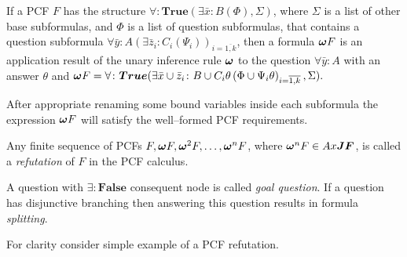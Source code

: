 \documentclass[runningheads,a4paper]{llncs}
\begin{document}

\begin{definition}
If a PCF $F$ has the structure $\forall\colon\boldsymbol{True}\left(\exists \bar{x}\colon B\left(\Phi\right),\Sigma\right)$, where $\Sigma$ is a list of other base subformulas, and $\Phi$ is a list of question subformulas, that contains a question subformula $\forall \bar{y}\colon A(\exists \bar{z}_i\colon C_i\left(\Psi_i\right))_{i=\overline{1,k}}$, then a formula $\boldsymbol{\omega} F$ is an application result of the unary inference rule $\boldsymbol{\omega}$ to the question $\forall \bar{y}\colon A$ with an answer $\theta$ and $\boldsymbol{\omega} F = \forall\colon\boldsymbol{True}(\exists \bar{x} \cup \bar{z}_i\colon B \cup C_i\theta\left(\Phi \cup \Psi_i\theta\right)_{i=\overline{1,k}},\Sigma).$
\end{definition}

After appropriate renaming some bound variables inside each subformula the expression $\boldsymbol{\omega} F$ will satisfy the well--formed PCF requirements. %

%
Any finite sequence of PCFs $F, \boldsymbol{\omega} F, \boldsymbol{\omega}^2 F,\ldots,\boldsymbol{\omega}^n F$, where $\boldsymbol{\omega}^n F \in Ax\boldsymbol{JF}$, is called a {\em refutation} of $F$ in the PCF calculus.

A question with $\exists:\boldsymbol{False}$ consequent node is called {\em goal question}. If a question has disjunctive branching then answering this question results in formula {\em splitting}.

For clarity consider simple example of a PCF refutation.
\end{document}
